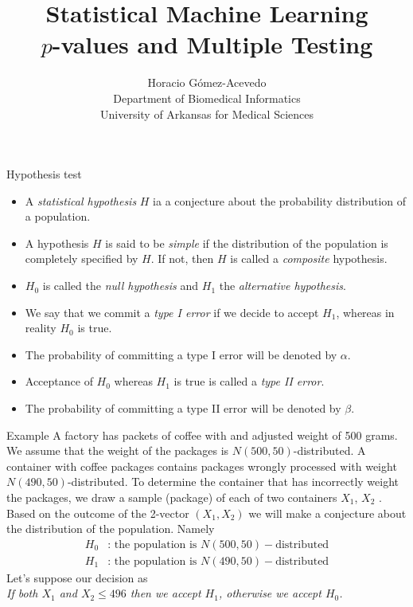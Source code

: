 \documentclass{beamer}
\title{Statistical Machine Learning\\ $p$-values and Multiple Testing}
\author{Horacio G\'omez-Acevedo\\ Department of Biomedical Informatics\\
	University of Arkansas for Medical Sciences}
\begin{document}
	\begin{frame}[plain]
		\maketitle
	\end{frame}
	
	\begin{frame}{Hypothesis test}
		\begin{itemize}
			\item A \textit{statistical hypothesis} $H$ ia a conjecture about the probability distribution of a population.
			\item A hypothesis $H$ is said to be \textit{simple} if the distribution of the population is completely specified by $H$. If not, then $H$ is called a \textit{composite} hypothesis.
			\item $H_0$ is called the \textit{null hypothesis} and $H_1$ the \textit{alternative hypothesis}.
			\item  We say that we commit a  \textit{type I error} if we decide to accept $H_1$, whereas in reality $H_0$ is true.
			\item  The probability of committing a type I error will be denoted by $\alpha$.
			\item Acceptance of $H_0$ whereas $H_1$ is true is called a \textit{type II error}. 
			\item  The probability of committing a type II error will be denoted by $\beta$.  
		\end{itemize}		

	\end{frame}

\begin{frame}{Example}
	A factory has packets of coffee with and adjusted weight of 500 grams. We assume that the weight of the packages is $N(500,50)$-distributed. A container with coffee packages contains packages wrongly processed with weight $N(490,50)$-distributed. To determine the container that has incorrectly weight the packages, we draw a sample (package) of each of two containers $X_1$, $X_2$ . Based on the outcome of the 2-vector $(X_1,X_2)$ we will make a conjecture about the distribution of the population. Namely
	\begin{equation*}
		\begin{split}
			H_0 & \text{: the population is } N(500,50)-\text{distributed}\\
			H_1 & \text{: the population is } N(490,50)-\text{distributed}
		\end{split}
	\end{equation*}
	Let's suppose our decision as\\
	\textit{If both $X_1$ and $X_2 \le 496$ then we accept $H_1$, otherwise we accept $H_0$. }
\end{frame}
\end{document}
